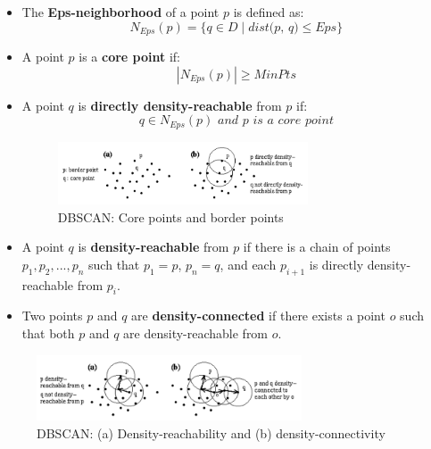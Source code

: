 \documentclass[a4paper,12pt,twoside]{scrreprt}
\begin{document}
\begin{itemize}
  \item The \textbf{Eps-neighborhood} of a point $p$ is defined as:
        \[
          N_{\textit{Eps}}(p) = \{q \in D \mid \textit{dist(p, q)} \leq
          \textit{Eps} \}
        \]

  \item A point $p$ is a \textbf{core point} if:
        \[
          |N_{\textit{Eps}}(p)| \geq \textit{MinPts}
        \]

  \item A point $q$ is \textbf{directly density-reachable} from $p$ if:
        \[
          q \in N_{\textit{Eps}}(p) \textit{ and } p \textit{ is a core point}
        \]

        \begin{figure}[htbp]
          \centering

          \includegraphics[width=0.7\textwidth]{Figures/background/dbscan_core_points_and_border_points.png}
          \caption{DBSCAN: Core points and border points
            \cite{ester_density-based_nodate}}
          \label{fig:dbscan-reachability-and-connectivity}
        \end{figure}

  \item A point $q$ is \textbf{density-reachable} from $p$ if there is a chain
        of points
        $p_1, p_2, ..., p_n$ such that $p_1 = p$, $p_n = q$, and each $p_{i+1}$
        is
        directly
        density-reachable from $p_i$.

  \item Two points $p$ and $q$ are \textbf{density-connected} if there exists a
        point
        $o$ such that both $p$ and $q$ are density-reachable from $o$.
\end{itemize}

\begin{figure}[htbp]
  \centering

  \includegraphics[width=0.7\textwidth]{Figures/background/dbscan_density_reachability_connectivity.png}
  \caption{DBSCAN: (a) Density-reachability and (b) density-connectivity
    \cite{ester_density-based_nodate}}
  \label{fig:dbscan-reachability-and-connectivity}
\end{figure}
\FloatBarrier
\end{document}
